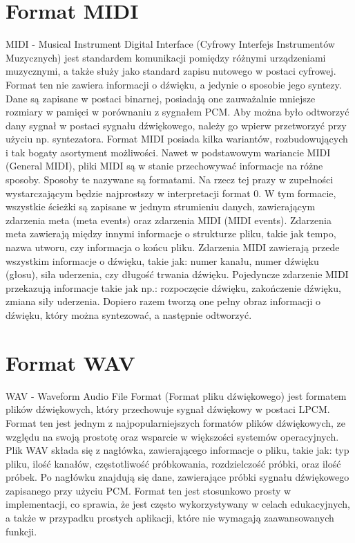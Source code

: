 \section{Format MIDI}
MIDI - Musical Instrument Digital Interface (Cyfrowy Interfejs Instrumentów Muzycznych) jest standardem komunikacji pomiędzy różnymi urządzeniami muzycznymi, a także służy jako standard zapisu nutowego w postaci cyfrowej. Format ten nie zawiera informacji o dźwięku, a jedynie o sposobie jego syntezy. Dane są zapisane w postaci binarnej, posiadają one zauważalnie mniejsze rozmiary w pamięci w porównaniu z sygnałem PCM. Aby można było odtworzyć dany sygnał w postaci sygnału dźwiękowego, należy go wpierw przetworzyć przy użyciu np. syntezatora. Format MIDI posiada kilka wariantów, rozbudowujących i tak bogaty asortyment możliwości. Nawet w podstawowym wariancie MIDI (General MIDI), pliki MIDI są w stanie przechowywać informacje na różne sposoby. Sposoby te nazywane są formatami. Na rzecz tej prazy w zupełności wystarczającym będzie najprostszy w interpretacji format 0. W tym formacie, wszystkie ścieżki są zapisane w jednym strumieniu danych, zawierającym zdarzenia meta (meta events) oraz zdarzenia MIDI (MIDI events). Zdarzenia meta zawierają między innymi informacje o strukturze pliku, takie jak tempo, nazwa utworu, czy informacja o końcu pliku. Zdarzenia MIDI zawierają przede wszystkim informacje o dźwięku, takie jak: numer kanału, numer dźwięku (głosu), siła uderzenia, czy długość trwania dźwięku. Pojedyncze zdarzenie MIDI przekazują informacje takie jak np.: rozpoczęcie dźwięku, zakończenie dźwięku, zmiana siły uderzenia. Dopiero razem tworzą one pełny obraz informacji o dźwięku, który można syntezować, a następnie odtworzyć.

\section{Format WAV}
WAV - Waveform Audio File Format (Format pliku dźwiękowego) jest formatem plików dźwiękowych, który przechowuje sygnał dźwiękowy w postaci LPCM. Format ten jest jednym z najpopularniejszych formatów plików dźwiękowych, ze względu na swoją prostotę oraz wsparcie w większości systemów operacyjnych. Plik WAV składa się z nagłówka, zawierającego informacje o pliku, takie jak: typ pliku, ilość kanałów, częstotliwość próbkowania, rozdzielczość próbki, oraz ilość próbek. Po nagłówku znajdują się dane, zawierające próbki sygnału dźwiękowego zapisanego przy użyciu PCM. Format ten jest stosunkowo prosty w implementacji, co sprawia, że jest często wykorzystywany w celach edukacyjnych, a także w przypadku prostych aplikacji, które nie wymagają zaawansowanych funkcji.



